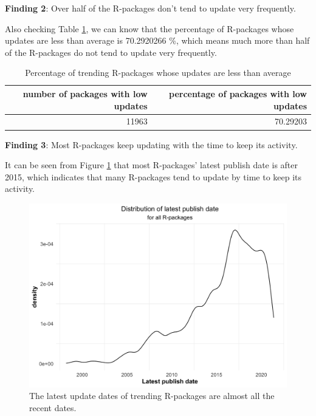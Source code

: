 \documentclass[
]{book}
\newenvironment{discovery}[1]{%
  \begin{tcolorbox}[colback=blue!30,colframe=blue!80!black]#1}{\end{tcolorbox}}
\begin{document}
\begin{discovery}
\textbf{Finding 2}: Over half of the R-packages don't tend to update
very frequently.
\end{discovery}

Also checking Table \ref{tab:pct-lowupdates}, we can know that the percentage of R-packages whose updates are less than average is 70.2920266 \%, which means much more than half of the R-packages do not tend to update very frequently.

\begin{table}

\caption{\label{tab:pct-lowupdates}Percentage of trending R-packages whose updates are less than average}
\centering
\begin{tabular}[t]{r|r}
\hline
number of packages with low updates & percentage of packages with low updates\\
\hline
11963 & 70.29203\\
\hline
\end{tabular}
\end{table}

\begin{discovery}
\textbf{Finding 3}: Most R-packages keep updating with the time to keep
its activity.
\end{discovery}

It can be seen from Figure \ref{fig:latestpublish} that most R-packages' latest publish date is after 2015, which indicates that many R-packages tend to update by time to keep its activity.



\begin{figure}

{\centering \includegraphics{figures/latestpublish-1} 

}

\caption{The latest update dates of trending R-packages are almost all the recent dates.}\label{fig:latestpublish}
\end{figure}
\end{document}
